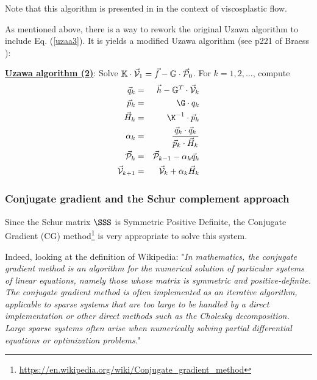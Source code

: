 Note that this algorithm is presented in \cite{zivt85} in the context of viscosplastic flow.

As mentioned above, there is a way to rework the original Uzawa algorithm 
to include Eq. (\ref{uzaa3}). It is yields a modified 
Uzawa algorithm (see p221 of Braess \cite{braess}):


\begin{mdframed}[backgroundcolor=blue!5]
\underline{\bf Uzawa algorithm (2)}:
Solve $\mathbb{K}\cdot \vec{\cal V}_1 = \vec f - \mathbb{G}\cdot  \vec{\cal P}_0$. 
For $k=1,2,...$, compute 
\begin{eqnarray}
\vec q_k &=& \vec h-\mathbb{G}^T \cdot \vec{\cal V}_k \\
\vec{p}_k &=& {\G}\cdot q_k \\
\vec H_k &=& {\K}^{-1}\cdot \vec{p}_k \\
\alpha_k &=& \frac{\vec q_k \cdot \vec q_k}{\vec{p}_k \cdot \vec H_k} \\
\vec {\cal P}_k &=& \vec {\cal P}_{k-1} - \alpha_k  \vec q_k \\
\vec {\cal V}_{k+1} &=& \vec {\cal V}_k + \alpha_k  \vec H_k
\end{eqnarray}
\end{mdframed}


\Literature \cite{cach88,cao03}





\subsubsection{Conjugate gradient and the Schur complement approach }


 
Since the Schur matrix $\SSS$ is Symmetric Positive Definite, 
the Conjugate Gradient (CG) method\footnote{\url{https://en.wikipedia.org/wiki/Conjugate_gradient_method}} \cite{hest52} 
is very appropriate to solve this system. 

Indeed, looking at the definition of Wikipedia: "{\it In mathematics, the conjugate gradient method is an algorithm 
for the numerical solution of particular systems of linear equations, namely those whose matrix is symmetric and positive-definite. 
The conjugate gradient method is often implemented as an iterative algorithm, applicable to sparse systems that are too large 
to be handled by a direct implementation or other direct methods such as the Cholesky decomposition. 
Large sparse systems often arise when numerically solving partial differential equations or optimization problems.}"

